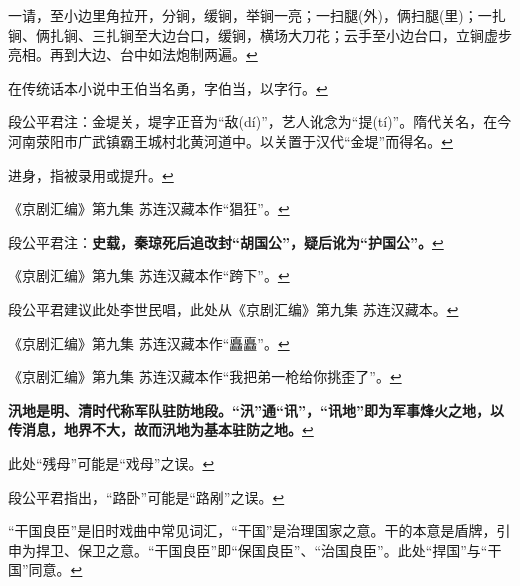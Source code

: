   一请，至小边里角拉开，分锏，缓锏，举锏一亮；一扫腿(外)，俩扫腿(里)；一扎锏、俩扎锏、三扎锏至大边台口，缓锏，横场大刀花；云手至小边台口，立锏虚步亮相。再到大边、台中如法炮制两遍。\protect\hyperlink{fnref323}{↩}
\item
  \leavevmode\hypertarget{fn324}{}%
  在传统话本小说中王伯当名勇，字伯当，以字行。\protect\hyperlink{fnref324}{↩}
\item
  \leavevmode\hypertarget{fn325}{}%
  段公平君注：金堤关，堤字正音为``敌(dí)''，艺人讹念为``提(tí)''。隋代关名，在今河南荥阳市广武镇霸王城村北黄河道中。以关置于汉代``金堤''而得名。\protect\hyperlink{fnref325}{↩}
\item
  \leavevmode\hypertarget{fn326}{}%
  进身，指被录用或提升。\protect\hyperlink{fnref326}{↩}
\item
  \leavevmode\hypertarget{fn327}{}%
  《京剧汇编》第九集
  苏连汉藏本作``猖狂''。\protect\hyperlink{fnref327}{↩}
\item
  \leavevmode\hypertarget{fn328}{}%
  段公平君注：\textbf{史载，秦琼死后追改封``胡国公''，疑后讹为``护国公''。}\protect\hyperlink{fnref328}{↩}
\item
  \leavevmode\hypertarget{fn329}{}%
  《京剧汇编》第九集
  苏连汉藏本作``跨下''。\protect\hyperlink{fnref329}{↩}
\item
  \leavevmode\hypertarget{fn330}{}%
  段公平君建议此处李世民唱，此处从《京剧汇编》第九集
  苏连汉藏本。\protect\hyperlink{fnref330}{↩}
\item
  \leavevmode\hypertarget{fn331}{}%
  《京剧汇编》第九集
  苏连汉藏本作``矗矗''。\protect\hyperlink{fnref331}{↩}
\item
  \leavevmode\hypertarget{fn332}{}%
  《京剧汇编》第九集
  苏连汉藏本作``我把弟一枪给你挑歪了''。\protect\hyperlink{fnref332}{↩}
\item
  \leavevmode\hypertarget{fn333}{}%
  \textbf{汛地是明、清时代称军队驻防地段。``汛''通``讯''，``讯地''即为军事烽火之地，以传消息，地界不大，故而汛地为基本驻防之地。}\protect\hyperlink{fnref333}{↩}
\item
  \leavevmode\hypertarget{fn334}{}%
  此处``残母''可能是``戏母''之误。\protect\hyperlink{fnref334}{↩}
\item
  \leavevmode\hypertarget{fn335}{}%
  段公平君指出，``路卧''可能是``路剐''之误。\protect\hyperlink{fnref335}{↩}
\item
  \leavevmode\hypertarget{fn336}{}%
  ``干国良臣''是旧时戏曲中常见词汇，``干国''是治理国家之意。干的本意是盾牌，引申为捍卫、保卫之意。``干国良臣''即``保国良臣''、``治国良臣''。此处``捍国''与``干国''同意。\protect\hyperlink{fnref336}{↩}
